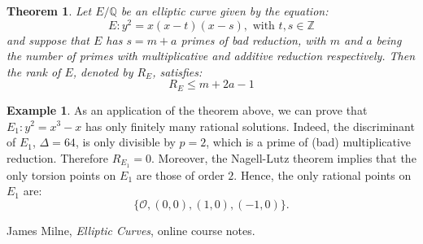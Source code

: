 \documentclass[12pt]{article}
\newtheorem*{thm}{Theorem}
\theoremstyle{definition}
\newtheorem*{exam}{Example}
\newcommand{\Ints}{\mathbb{Z}}
\newcommand{\Rats}{\mathbb{Q}}
\begin{document}
\begin{thm}
Let $E/\Rats$ be an elliptic curve given by the equation:
$$E\colon y^2=x(x-t)(x-s), \text{ with } t,s\in \Ints$$
and suppose that $E$ has $s=m+a$ primes of bad reduction, with $m$ and $a$ being the number of primes with multiplicative and additive reduction respectively. Then the rank of $E$, denoted by $R_E$, satisfies:
$$R_E\leq m+2a-1$$
\end{thm}

\begin{exam}

As an application of the theorem above, we can prove that $E_1\colon y^2=x^3-x$ has only finitely many rational solutions. Indeed, the discriminant of $E_1$, $\Delta=64$, is only divisible by $p=2$, which is a prime of (bad) multiplicative reduction. Therefore $R_{E_1}=0$. Moreover, the Nagell-Lutz theorem implies that the only torsion points on $E_1$ are those of order $2$. Hence, the only rational points on $E_1$ are:
$$\{ \mathcal{O}, (0,0),(1,0),(-1,0)\}.$$
\end{exam}

\begin{thebibliography}{9}
 James Milne, {\em Elliptic Curves}, online course notes.\\ 
\end{thebibliography}
\end{document}
